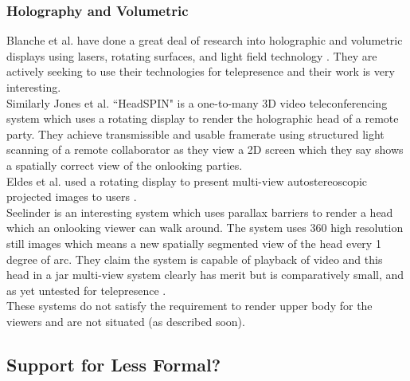 \subsubsection{Holography and Volumetric}
Blanche et al. have done a great deal of research into holographic and volumetric displays using lasers, rotating surfaces, and light field technology   \cite{Blanche2010,tay2008updatable}. They are actively seeking to use their technologies for telepresence and their work is very interesting.\\
Similarly Jones et al. ``HeadSPIN" is a one-to-many 3D video teleconferencing system \cite{jones2009headspin} which uses a rotating display to render the holographic head of a remote party. They achieve transmissible and usable framerate using structured light scanning of a remote collaborator as they view a 2D screen which they say shows a spatially correct view of the onlooking parties.\\
Eldes et al. used a rotating display to present multi-view autostereoscopic projected images to users \cite{eldes2013multi}.\\
Seelinder is an interesting system which uses parallax barriers to render a head which an onlooking viewer can walk around. The system uses 360 high resolution still images which means a new spatially segmented view of the head every 1 degree of arc. They claim the system is capable of playback of video and this head in a jar multi-view system clearly has merit but is comparatively small, and as yet untested for telepresence \cite{Yendo2010}.\\
These systems do not satisfy the requirement to render upper body for the viewers and are not situated (as described soon).\\

        \subsection{Support for Less Formal?}
        
